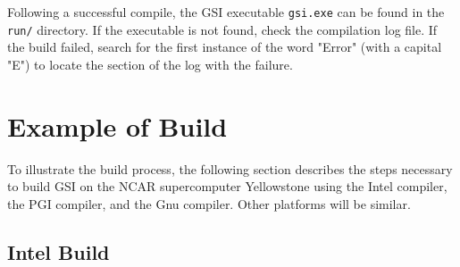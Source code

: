 Following a successful compile, the GSI executable \verb|gsi.exe| can be found in the \verb|run/| directory.
If the executable is not found, check the compilation log file. If the build failed, search for the first instance of the word "Error" (with a capital "E") to locate the section of the log with the failure.

\section{Example of Build} \label{ch2_buildexample}

To illustrate the build process, the following section describes the steps necessary to build GSI on the NCAR supercomputer Yellowstone using the Intel compiler, the PGI compiler, and the Gnu compiler. Other platforms will be similar.

\subsection{Intel Build}

